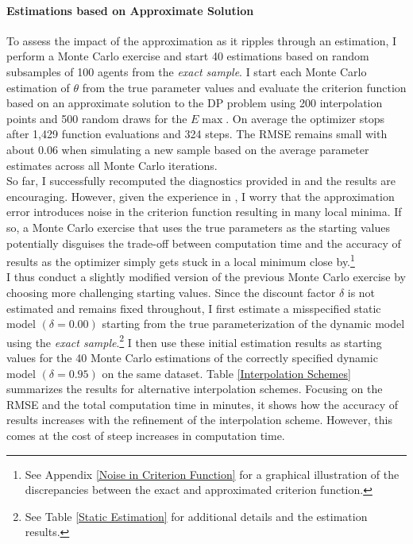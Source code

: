 \paragraph{Estimations based on Approximate Solution}
To assess the impact of the approximation as it ripples through an estimation, I perform a Monte Carlo exercise and start 40 estimations based on random subsamples of 100 agents from the \textit{exact sample}. I start each Monte Carlo estimation of $\theta$ from the true parameter values and evaluate the criterion function based on an approximate solution to the DP problem using 200 interpolation points and 500 random draws for the $E\max$. On average the optimizer stops after 1,429 function evaluations and 324 steps. The RMSE remains small with about 0.06 when simulating a new sample based on the average parameter estimates across all Monte Carlo iterations. \\\newline
%
So far, I successfully recomputed the diagnostics provided in \citet{Keane.1994} and the results are encouraging. However, given the experience in \citet{Eisenhauer.2015b}, I worry that the approximation error introduces noise in the criterion function resulting in many local minima. If so, a Monte Carlo exercise that uses the true parameters as the starting values potentially disguises the trade-off between computation time and the accuracy of results as the optimizer simply gets stuck in a local minimum close by.\footnote{See Appendix \ref{Noise in Criterion Function} for a graphical illustration of the discrepancies between the exact and approximated criterion function.}\\\newline
%
I thus conduct a slightly modified version of the previous Monte Carlo exercise by choosing more challenging starting values. Since the discount factor $\delta$ is not estimated and remains fixed throughout, I first estimate a misspecified static model $(\delta = 0.00)$ starting from the true parameterization of the dynamic model using the \textit{exact sample}.\footnote{See Table \ref{Static Estimation} for additional details and the estimation results.} I then use these initial estimation results as starting values for the 40 Monte Carlo estimations of the correctly specified dynamic model $(\delta = 0.95)$ on the same dataset. Table \ref{Interpolation Schemes} summarizes the results for alternative interpolation schemes. Focusing on the RMSE and the total computation time in minutes, it shows how the accuracy of results increases with the refinement of the interpolation scheme. However, this comes at the cost of steep increases in computation time.

